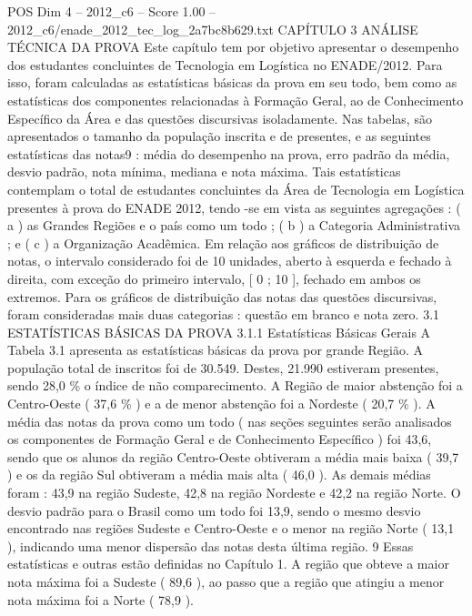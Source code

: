 \begin{textsample}{POS Dim 4 – 2012\_c6 – Score 1.00 – 2012\_c6/enade\_2012\_tec\_log\_2a7bc8b629.txt}  \label{ex:f4_pos_129}
CAPÍTULO 3 ANÁLISE TÉCNICA DA PROVA Este capítulo tem por objetivo apresentar o desempenho dos estudantes concluintes de Tecnologia em Logística no ENADE/2012.
Para isso, foram calculadas as estatísticas básicas da prova em seu todo, bem como as estatísticas dos componentes relacionadas à Formação Geral, ao de Conhecimento Específico da Área e das questões discursivas isoladamente.
Nas tabelas, são apresentados o tamanho da população inscrita e de presentes, e as seguintes estatísticas das notas9 : média do desempenho na prova, erro padrão da média, desvio padrão, nota mínima, mediana e nota máxima.
Tais estatísticas contemplam o total de estudantes concluintes da Área de Tecnologia em Logística presentes à prova do ENADE 2012, tendo -se em vista as seguintes agregações : ( a ) as Grandes Regiões e o país como um todo ; ( b ) a Categoria Administrativa ; e ( c ) a Organização Acadêmica.
Em relação aos gráficos de distribuição de notas, o intervalo considerado foi de 10 unidades, aberto à esquerda e fechado à direita, com exceção do primeiro intervalo, [ 0 ; 10 ], fechado em ambos os extremos.
Para os gráficos de distribuição das notas das questões discursivas, foram consideradas mais duas categorias : questão em branco e nota zero. 3.1 ESTATÍSTICAS BÁSICAS DA PROVA 3.1.1 Estatísticas Básicas Gerais A Tabela 3.1 apresenta as estatísticas básicas da prova por grande Região.
A população total de inscritos foi de 30.549.
Destes, 21.990 estiveram presentes, sendo 28,0 \% o índice de não comparecimento.
A Região de maior abstenção foi a Centro-Oeste ( 37,6 \% ) e a de menor abstenção foi a Nordeste ( 20,7 \% ).
A média das notas da prova como um todo ( nas seções seguintes serão analisados os componentes de Formação Geral e de Conhecimento Específico ) foi 43,6, sendo que os alunos da região Centro-Oeste obtiveram a média mais baixa ( 39,7 ) e os da região Sul obtiveram a média mais alta ( 46,0 ).
As demais médias foram : 43,9 na região Sudeste, 42,8 na região Nordeste e 42,2 na região Norte.
O desvio padrão para o Brasil como um todo foi 13,9, sendo o mesmo desvio encontrado nas regiões Sudeste e Centro-Oeste e o menor na região Norte ( 13,1 ), indicando uma menor dispersão das notas desta última região. 9 Essas estatísticas e outras estão definidas no Capítulo 1.
A região que obteve a maior nota máxima foi a Sudeste ( 89,6 ), ao passo que a região que atingiu a menor nota máxima foi a Norte ( 78,9 ).

\end{textsample}

